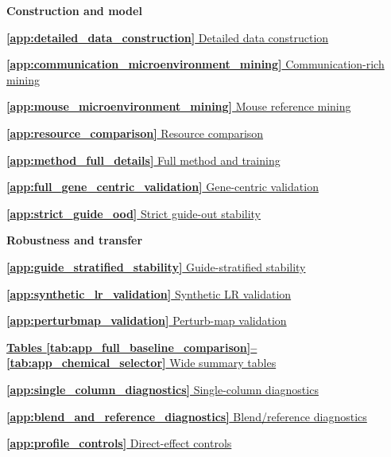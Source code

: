 \documentclass[sigconf,review,balance=false]{acmart}
\begin{document}
{\begin{minipage}{\textwidth}
\begin{minipage}{0.315\textwidth}
\raggedright\small
\textbf{Construction and model}\par
\vspace{2pt}
\hyperref[app:detailed_data_construction]{\textbf{\ref*{app:detailed_data_construction}} Detailed data construction}\par
\hyperref[app:communication_microenvironment_mining]{\textbf{\ref*{app:communication_microenvironment_mining}} Communication-rich mining}\par
\hyperref[app:mouse_microenvironment_mining]{\textbf{\ref*{app:mouse_microenvironment_mining}} Mouse reference mining}\par
\hyperref[app:resource_comparison]{\textbf{\ref*{app:resource_comparison}} Resource comparison}\par
\hyperref[app:method_full_details]{\textbf{\ref*{app:method_full_details}} Full method and training}\par
\hyperref[app:full_gene_centric_validation]{\textbf{\ref*{app:full_gene_centric_validation}} Gene-centric validation}\par
\hyperref[app:strict_guide_ood]{\textbf{\ref*{app:strict_guide_ood}} Strict guide-out stability}\par
\end{minipage}
\hfill
\begin{minipage}{0.315\textwidth}
\raggedright\small
\textbf{Robustness and transfer}\par
\vspace{2pt}
\hyperref[app:guide_stratified_stability]{\textbf{\ref*{app:guide_stratified_stability}} Guide-stratified stability}\par
\hyperref[app:synthetic_lr_validation]{\textbf{\ref*{app:synthetic_lr_validation}} Synthetic LR validation}\par
\hyperref[app:perturbmap_validation]{\textbf{\ref*{app:perturbmap_validation}} Perturb-map validation}\par
\hyperref[tab:app_full_baseline_comparison]{\textbf{Tables \ref*{tab:app_full_baseline_comparison}--\ref*{tab:app_chemical_selector}} Wide summary tables}\par
\hyperref[app:single_column_diagnostics]{\textbf{\ref*{app:single_column_diagnostics}} Single-column diagnostics}\par
\hyperref[app:blend_and_reference_diagnostics]{\textbf{\ref*{app:blend_and_reference_diagnostics}} Blend/reference diagnostics}\par
\hyperref[app:profile_controls]{\textbf{\ref*{app:profile_controls}} Direct-effect controls}\par

\end{minipage}
\end{minipage}}
\end{document}
